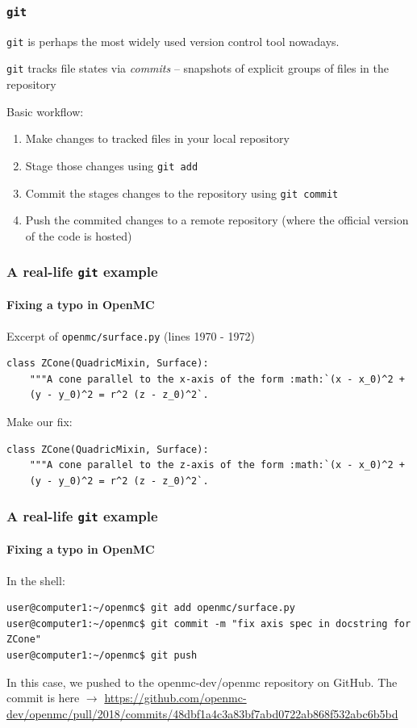 \begin{frame}[fragile]
    \frametitle{\verb:git:}
    \verb:git: is perhaps the most widely used version control tool nowadays.

    \verb:git: tracks file states via {\it commits} -- snapshots of explicit groups of files in the repository

    Basic workflow:
    \begin{enumerate}
        \item Make changes to tracked files in your local repository
        \item Stage those changes using \verb:git add:
        \item Commit the stages changes to the repository using \verb:git commit:
        \item Push the commited changes to a remote repository (where the official version of the code is hosted)
    \end{enumerate}

\end{frame}

\begin{frame}[fragile]
    \frametitle{A real-life \verb:git: example}
    \framesubtitle{Fixing a typo in OpenMC}

    Excerpt of \verb:openmc/surface.py: (lines 1970 - 1972)

    \begin{verbatim}
class ZCone(QuadricMixin, Surface):
    """A cone parallel to the x-axis of the form :math:`(x - x_0)^2 + 
    (y - y_0)^2 = r^2 (z - z_0)^2`.
    \end{verbatim}

    Make our fix:

    \begin{verbatim}
class ZCone(QuadricMixin, Surface):
    """A cone parallel to the z-axis of the form :math:`(x - x_0)^2 + 
    (y - y_0)^2 = r^2 (z - z_0)^2`.
    \end{verbatim}
\end{frame}

\begin{frame}[fragile]
    \frametitle{A real-life \verb:git: example}
    \framesubtitle{Fixing a typo in OpenMC}

    In the shell:

    \begin{verbatim}
user@computer1:~/openmc$ git add openmc/surface.py
user@computer1:~/openmc$ git commit -m "fix axis spec in docstring for 
ZCone"
user@computer1:~/openmc$ git push
    \end{verbatim}

    In this case, we pushed to the openmc-dev/openmc repository on GitHub. The commit is here $\rightarrow$ \url{https://github.com/openmc-dev/openmc/pull/2018/commits/48dbf1a4c3a83bf7abd0722ab868f532abc6b5bd} 
\end{frame}
